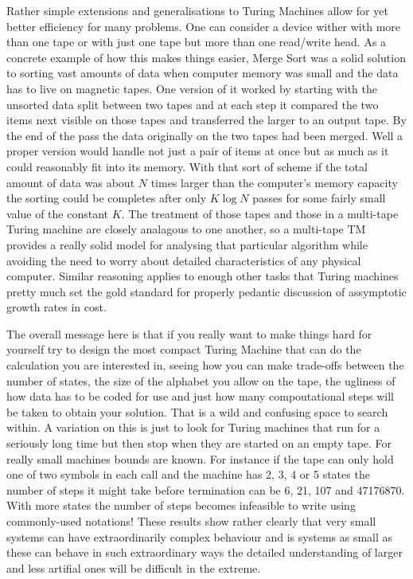 Rather simple extensions and generalisations to Turing Machines allow
for yet better efficiency for many problems. One can consider a
device wither with more than one tape or with just one tape but more than
one read/write head.  As a concrete example of how this makes things easier,
Merge Sort was a solid solution to sorting vast amounts of data
when computer memory was small and the data has to live on magnetic tapes.
One version of it worked by starting with the unsorted data split
between two tapes and at each step it compared the two items next visible
on those tapes and transferred the larger to an output tape. By the end of
the pass the data originally on the two tapes had been merged. Well a proper
version would handle not just a pair of items at once but as much as
it could reasonably fit into its memory. With that sort of scheme if
the total amount of data was about $N$ times larger than the computer's
memory capacity the sorting could be completes after only $K \log N$ passes
for some fairly small value of the constant $K$. 
The treatment of those tapes and those in a multi-tape Turing machine
are closely analagous to one another, so a multi-tape TM provides a
really solid model for analysing that particular algorithm while avoiding
the need to worry about detailed characteristics of any physical
computer. Similar reasoning applies to enough other tasks that Turing
machines pretty much set the gold standard for properly pedantic
discussion of assymptotic growth rates in cost.

The overall message here is that if you really want to make things
hard for yourself try to design the most compact Turing Machine
that can do the calculation you are interested in, seeing how you
can make trade-offs between the number of states, the size of the
alphabet you allow on the tape, the ugliness of how data has to be
coded for use and just how many compoutational steps will be taken
to obtain your solution. That is a wild and confusing space to
search within. A variation on this is just to look for Turing machines
that run for a seriously long time but then stop when they are started
on an empty tape. For really small machines bounds are known. For instance
if the tape can only hold one of two symbols in each call and the
machine has 2, 3, 4 or 5 states the number of steps it might take
before termination can be 6, 21, 107 and 47176870. With more states
the number of steps becomes infeasible to write using commonly-used
notations! These results show rather clearly that very small systems
can have extraordinarily complex behaviour and is systems as small
as these can behave in such extraordinary ways the detailed understanding of
larger and less artifial ones will be difficult in the extreme.

